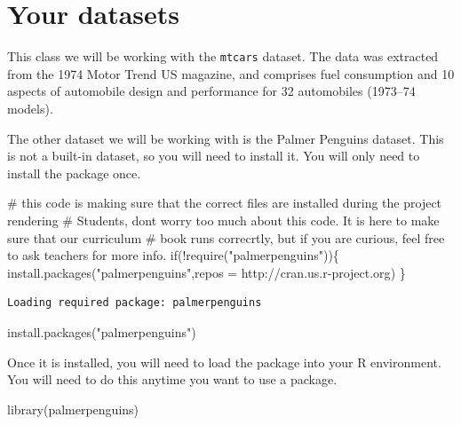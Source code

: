 \documentclass[
  letterpaper,
  DIV=11,
  numbers=noendperiod]{scrreprt}
\newenvironment{Shaded}{\begin{snugshade}}{\end{snugshade}}
\newcommand{\AttributeTok}[1]{\textcolor[rgb]{0.40,0.45,0.13}{#1}}
\newcommand{\CommentTok}[1]{\textcolor[rgb]{0.37,0.37,0.37}{#1}}
\newcommand{\ControlFlowTok}[1]{\textcolor[rgb]{0.00,0.23,0.31}{#1}}
\newcommand{\FunctionTok}[1]{\textcolor[rgb]{0.28,0.35,0.67}{#1}}
\newcommand{\NormalTok}[1]{\textcolor[rgb]{0.00,0.23,0.31}{#1}}
\newcommand{\SpecialCharTok}[1]{\textcolor[rgb]{0.37,0.37,0.37}{#1}}
\newcommand{\StringTok}[1]{\textcolor[rgb]{0.13,0.47,0.30}{#1}}
\begin{document}
\section{Your datasets}\label{your-datasets}

This class we will be working with the \texttt{mtcars} dataset. The data
was extracted from the 1974 Motor Trend US magazine, and comprises fuel
consumption and 10 aspects of automobile design and performance for 32
automobiles (1973--74 models).

The other dataset we will be working with is the Palmer Penguins
dataset. This is not a built-in dataset, so you will need to install it.
You will only need to install the package once.

\begin{Shaded}
\begin{Highlighting}[]
\CommentTok{\# this code is making sure that the correct files are installed during the project rendering}
\CommentTok{\# Students, don\textquotesingle{}t worry too much about this code. It is here to make sure that our curriculum}
\CommentTok{\# book runs correcrtly, but if you are curious, feel free to ask teachers for more info. }
\ControlFlowTok{if}\NormalTok{(}\SpecialCharTok{!}\FunctionTok{require}\NormalTok{(}\StringTok{"palmerpenguins"}\NormalTok{))\{}
  \FunctionTok{install.packages}\NormalTok{(}\StringTok{"palmerpenguins"}\NormalTok{,}\AttributeTok{repos =} \StringTok{\textquotesingle{}http://cran.us.r{-}project.org\textquotesingle{}}\NormalTok{)}
\NormalTok{\}}
\end{Highlighting}
\end{Shaded}

\begin{verbatim}
Loading required package: palmerpenguins
\end{verbatim}

\begin{Shaded}
\begin{Highlighting}[]
\FunctionTok{install.packages}\NormalTok{(}\StringTok{"palmerpenguins"}\NormalTok{)}
\end{Highlighting}
\end{Shaded}

Once it is installed, you will need to load the package into your R
environment. You will need to do this anytime you want to use a package.

\begin{Shaded}
\begin{Highlighting}[]
\FunctionTok{library}\NormalTok{(palmerpenguins)}
\end{Highlighting}
\end{Shaded}
\end{document}
